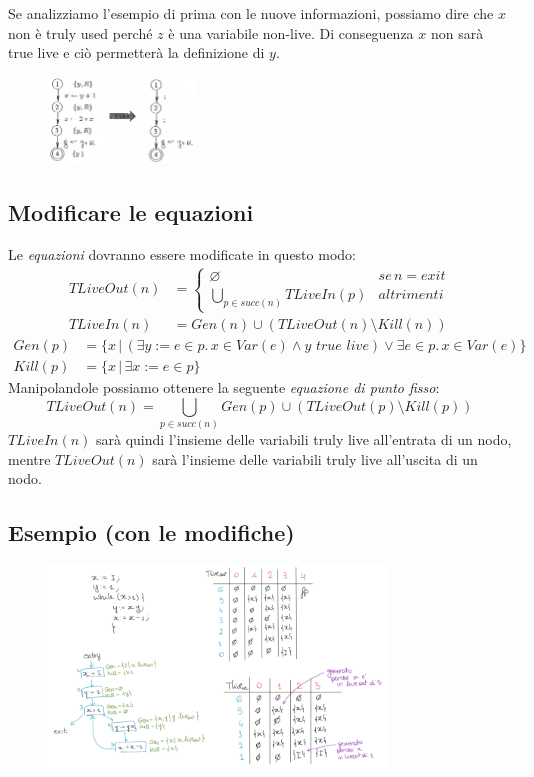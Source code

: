 \documentclass[a4paper,oneside,titlepage]{book}
\begin{document}
Se analizziamo l'esempio di prima con le nuove informazioni, possiamo dire che $x$ non è truly used perché $z$ è una variabile non-live. Di conseguenza $x$ non sarà true live e ciò permetterà la definizione di $y$.
\begin{figure}[htp]
	\centering
	\includegraphics[width=0.35\textwidth]{liveness9.png}
\end{figure}

\subsection{Modificare le equazioni}
Le \textit{equazioni} dovranno essere modificate in questo modo:
\begin{align*}
	TLiveOut(n) &=
	\begin{cases}
		\varnothing & se \, n=exit \\
		\bigcup_{p \in succ(n)} TLiveIn(p) & altrimenti
	\end{cases} \\
	TLiveIn(n) &= Gen(n) \cup (TLiveOut(n) \setminus Kill(n))
\end{align*}
\begin{align*}
	Gen(p) &= \{ x \, | \, (\exists y := e \in p. \, x \in Var(e) \wedge y \,\, true \,\, live) \vee \exists e \in p. \, x \in Var(e) \} \\
    Kill(p) &= \{ x \, | \, \exists x := e \in p \}
\end{align*}
Manipolandole possiamo ottenere la seguente \textit{equazione di punto fisso}:
\[ TLiveOut(n) = \bigcup_{p\in succ(n)} Gen(p) \cup (TLiveOut(p) \setminus Kill(p)) \]
$TLiveIn(n)$ sarà quindi l'insieme delle variabili truly live all'entrata di un nodo, mentre $TLiveOut(n)$ sarà l'insieme delle variabili truly live all'uscita di un nodo.

\subsection{Esempio (con le modifiche)}
\begin{figure}[htp]
	\centering
	\includegraphics[width=0.8\textwidth]{liveness7.png}
\end{figure}
\end{document}
